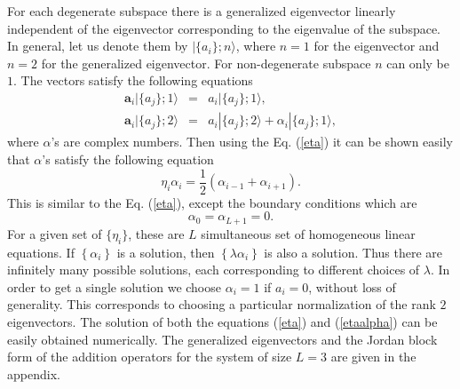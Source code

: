 \documentclass[11pt,a4paper]{book}
\begin{document}
For each degenerate subspace there is a generalized eigenvector
linearly independent of the eigenvector corresponding to the
eigenvalue of the subspace. In general, let us denote them by
$|\{a_i\};n \rangle$, where $n=1$ for the eigenvector and $n=2$ for
the generalized eigenvector. For non-degenerate subspace $n$ can only
be $1$. The vectors satisfy the following equations
\begin{eqnarray}
  \mathbf{a}_i|\{a_j\};1\rangle &=& a_i|\{a_j\};1\rangle, \nonumber \\
  \mathbf{a}_i|\{a_j\};2\rangle &=& a_i|\{a_j\};2\rangle + \alpha_i
|\{a_j\};1\rangle,
  \label{gen}
\end{eqnarray}
where $\alpha$'s are complex numbers. Then using the Eq. (\ref{eta}) it can be shown
easily that $\alpha$'s satisfy the following equation
\begin{equation}
  \eta_i\alpha_i=\frac{1}{2}(\alpha_{i-1}+\alpha_{i+1}).
  \label{etaalpha}
\end{equation}
This is similar to the Eq. (\ref{eta}), except the boundary conditions
which are
\begin{equation}
  \alpha_0=\alpha_{L+1}=0.
\end{equation}
For a given set of $\{\eta_i\}$, these are $L$ simultaneous set of homogeneous 
linear equations. If
$\left\{ \alpha_{i} \right\}$ is a solution, then $\left\{ \lambda
\alpha_{i}\right\}$ is also a solution. Thus there are infinitely many possible
solutions, each corresponding to different choices of $\lambda$.
In order to get a single solution we choose $\alpha_i=1$ if $a_i=0$, without
loss of generality. This corresponds to choosing a particular 
normalization of the rank $2$ eigenvectors.
The solution of both the equations (\ref{eta}) and
(\ref{etaalpha}) can be easily obtained numerically. 
The generalized eigenvectors and the Jordan block
form of the addition operators for the
system of size $L=3$ are given in the appendix.
\end{document}
